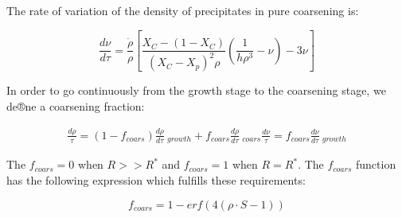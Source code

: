 \documentclass[12pt,a4paper]{article}
\begin{document}
The rate of variation of the density of precipitates in pure coarsening is:

\begin{equation}
\frac{d\nu}{d\tau} = \frac{\dot{\rho}}{\rho} \left[  \frac{X_C-(1-X_C)}{(X_C - X_p)^2 \rho} \left( \frac{1}{h\rho^3} - \nu\right)  - 3\nu \right] 
\end{equation}

In order to go continuously from the growth stage to the coarsening stage, we de®ne a coarsening fraction:

\begin{subequations}
	\begin{align}
	\frac{d\rho}{\tau} = (1-f_{coars}) \frac{d\rho}{d\tau}~ _{growth}  + f_{coars} \frac{d\rho}{d\tau}~ _{coars}
	\frac{d\nu}{\tau} = f_{coars} \frac{d\nu}{d\tau}~ _{growth}
	\end{align} 
\end{subequations}

The $f_{coars} = 0$ when $R >> R^*$ and $f_{coars} = 1$ when $R = R^*$. The $f_{coars}$ function has the following expression which fulfills these
requirements:

\begin{equation}
f_{coars} = 1 - erf \left(4(\rho \cdot S - 1) \right)
\end{equation}



\end{document}
